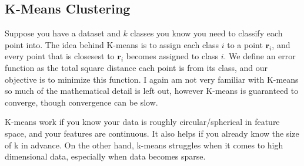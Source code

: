 \documentclass[11pt]{article}
\begin{document}
\subsection{K-Means Clustering}
\noindent Suppose you have a dataset and \( k \) classes you know you need to classify each point into. The idea behind K-means is to assign each class \( i \) to a point \( \mathbf{r}_{i} \), and every point that is closesest
to \( \mathbf{r}_{i} \) becomes assigned to class \( i \). We define an error function as the total square distance each point is from its class, and our objective is to minimize this function. I again am not very familiar with
K-means so much of the mathematical detail is left out, however K-means is guaranteed to converge, though convergence can be slow.

\noindent K-means work if you know your data is roughly circular/spherical in feature space, and your features are continuous. It also helps if you already know the size of k in advance. On the other hand, k-means struggles 
when it comes to high dimensional data, especially when data becomes sparse. 
\end{document}
